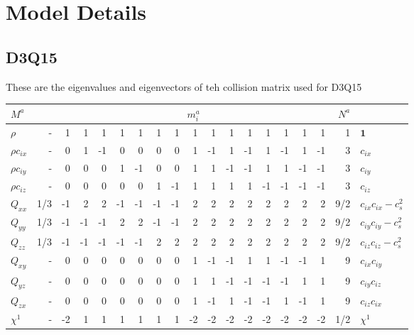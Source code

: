\section{Model Details}

\subsection{D3Q15}

These are the eigenvalues and eigenvectors of teh collision
matrix used for D3Q15


\begin{table}
\begin{tabular}{|l|r|r|rrrrrr|rrrrrrrr|r|l|}
\hline\hline
$M^a$ & & \multicolumn{15}{c|}{$m_i^a$} & $N^a$  &\\
\hline
$\rho$ & - &
 1 &  1 &  1 &  1 &  1 &  1 &  1 &  1 &  1 &  1 &  1 &  1 &  1 &  1 &  1 &
1 &$\mathbf{1}$ \\
\hline
$\rho c_{ix}$ & - &
 0 &  1 & -1 &  0 &  0 &  0 &  0 &  1 & -1 &  1 & -1 &  1 & -1 &  1 & -1 &
3  & $c_{ix}$ \\
\hline
$\rho c_{iy}$ & - &
 0 &  0 &  0 &  1 & -1 &  0 &  0 &  1 &  1 & -1 & -1 &  1 &  1 & -1 & -1 &
3  &$c_{iy}$ \\
\hline
$\rho c_{iz}$ & - &
 0 &  0 &  0 &  0 &  0 &  1 & -1 &  1 &  1 &  1 &  1 & -1 & -1 & -1 & -1 &
3  & $c_{iz}$ \\
\hline
$Q_{xx}$ & 1/3 &
-1 &  2 &  2 & -1 & -1 & -1 & -1 &  2 &  2 &  2 &  2 &  2 &  2 &  2 &  2 &
9/2  & $c_{ix} c_{ix} - c_s^2$ \\
\hline
$Q_{yy}$ & 1/3 &
-1 & -1 & -1 &  2 &  2 & -1 & -1 &  2 &  2 &  2 &  2 &  2 &  2 &  2 &  2 &
 9/2 & $c_{iy} c_{iy} - c_s^2$ \\
\hline
$Q_{zz}$ & 1/3 &
-1 & -1 & -1 & -1 & -1 &  2 &  2 &  2 &  2 &  2 &  2 &  2 &  2 &  2 &  2 &
 9/2 & $c_{iz} c_{iz} - c_s^2$ \\
\hline
$Q_{xy}$ & - &
 0 &  0 &  0 &  0 &  0 &  0 &  0 &  1 & -1 & -1 &  1 &  1 & -1 & -1 &  1 &
9  & $c_{ix} c_{iy}$ \\
\hline
$Q_{yz}$ & - &
 0 &  0 &  0 &  0 &  0 &  0 &  0 &  1 &  1 & -1 & -1 & -1 & -1 &  1 &  1 &
9  & $c_{iy} c_{iz}$ \\
\hline
$Q_{zx}$ & - &
 0 &  0 &  0 &  0 &  0 &  0 &  0 &  1 & -1 &  1 & -1 & -1 &  1 & -1 &  1 &
9  & $c_{iz} c_{ix}$ \\
\hline\hline
$\chi^1$ & - &
-2 &  1 &  1 &  1 &  1 &  1 &  1 & -2 & -2 & -2 & -2 & -2 & -2 & -2 & -2 &
1/2 & $\chi^1$ \\

\end{tabular}
\end{table}
